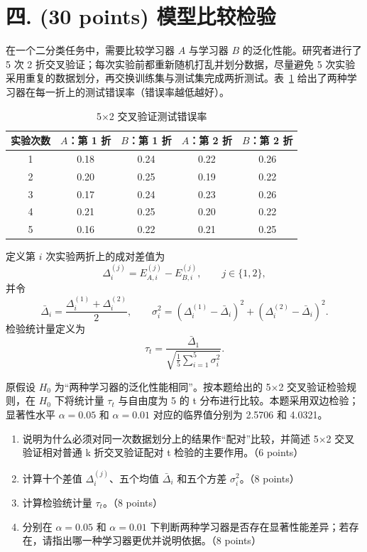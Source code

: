 \documentclass[8pt]{article}
\begin{document}
\clearpage
\section*{四. (30 points) 模型比较检验}

在一个二分类任务中，需要比较学习器 $A$ 与学习器 $B$ 的泛化性能。研究者进行了 5 次 2 折交叉验证；每次实验前都重新随机打乱并划分数据，尽量避免 5 次实验采用重复的数据划分，再交换训练集与测试集完成两折测试。表~\ref{tab:5x2cv} 给出了两种学习器在每一折上的测试错误率（错误率越低越好）。

\begin{table}[H]
\centering
\begin{tabular}{ccccc}
\toprule
\textbf{实验次数} & $A$：第 1 折 & $B$：第 1 折 & $A$：第 2 折 & $B$：第 2 折 \\
\midrule
1 & 0.18 & 0.24 & 0.22 & 0.26 \\
2 & 0.20 & 0.25 & 0.19 & 0.22 \\
3 & 0.17 & 0.24 & 0.23 & 0.26 \\
4 & 0.21 & 0.25 & 0.20 & 0.22 \\
5 & 0.16 & 0.22 & 0.21 & 0.25 \\
\bottomrule
\end{tabular}
\caption{5$\times$2 交叉验证测试错误率}
\label{tab:5x2cv}
\end{table}

定义第 $i$ 次实验两折上的成对差值为
\[
\Delta_i^{(j)}=E_{A,i}^{(j)}-E_{B,i}^{(j)},\qquad j\in\{1,2\},
\]
并令
\[
\bar{\Delta}_i=\frac{\Delta_i^{(1)}+\Delta_i^{(2)}}{2},\qquad
\sigma_i^2=\left(\Delta_i^{(1)}-\bar{\Delta}_i\right)^2+
\left(\Delta_i^{(2)}-\bar{\Delta}_i\right)^2.
\]
检验统计量定义为
\[
\tau_t=\frac{\bar{\Delta}_1}{\sqrt{\frac{1}{5}\sum_{i=1}^{5}\sigma_i^2}}.
\]

原假设 $H_0$ 为“两种学习器的泛化性能相同”。按本题给出的 5$\times$2 交叉验证检验规则，在 $H_0$ 下将统计量 $\tau_t$ 与自由度为 5 的 t 分布进行比较。本题采用双边检验；显著性水平 $\alpha=0.05$ 和 $\alpha=0.01$ 对应的临界值分别为 2.5706 和 4.0321。

\begin{enumerate}[leftmargin=2.2em,itemsep=0.55em]
  \item 说明为什么必须对同一次数据划分上的结果作“配对”比较，并简述 5$\times$2 交叉验证相对普通 k 折交叉验证配对 t 检验的主要作用。（6 points）
  \item 计算十个差值 $\Delta_i^{(j)}$、五个均值 $\bar{\Delta}_i$ 和五个方差 $\sigma_i^2$。（8 points）
  \item 计算检验统计量 $\tau_t$。（8 points）
  \item 分别在 $\alpha=0.05$ 和 $\alpha=0.01$ 下判断两种学习器是否存在显著性能差异；若存在，请指出哪一种学习器更优并说明依据。（8 points）
\end{enumerate}
\end{document}
